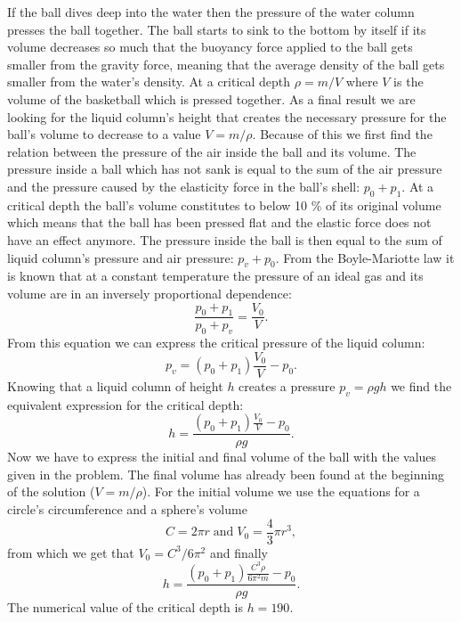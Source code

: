 \documentclass[11pt]{article}
\begin{document}
\solueng
If the ball dives deep into the water then the pressure of the water column presses the ball together. The ball starts to sink to the bottom by itself if its volume decreases so much that the buoyancy force applied to the ball gets smaller from the gravity force, meaning that the average density of the ball gets smaller from the water’s density. At a critical depth $\rho=m/V$ where $V$ is the volume of the basketball which is pressed together. As a final result we are looking for the liquid column’s height that creates the necessary pressure for the ball’s volume to decrease to a value $V=m/\rho$. Because of this we first find the relation between the pressure of the air inside the ball and its volume. The pressure inside a ball which has not sank is equal to the sum of the air pressure and the pressure caused by the elasticity force in the ball’s shell: $p_0+p_1$. At a critical depth the ball’s volume constitutes to below 10 \% of its original volume which means that the ball has been pressed flat and the elastic force does not have an effect anymore. The pressure inside the ball is then equal to the sum of liquid column’s pressure and air pressure: $p_v+p_0$. From the Boyle-Mariotte law it is known that at a constant temperature the pressure of an ideal gas and its volume are in an inversely proportional dependence:
\[
\frac{p_0+p_1}{p_0+p_v}=\frac{V_0}{V}.
\]
From this equation we can express the critical pressure of the liquid column:
\[
p_v = (p_0+p_1) \frac{V_0}{V} - p_0.
\] 
Knowing that a liquid column of height $h$ creates a pressure $p_v=\rho g h$ we find the equivalent expression for the critical depth:
\[
h = \frac{(p_0+p_1) \frac{V_0}{V} - p_0}{\rho g}.
\] 
Now we have to express the initial and final volume of the ball with the values given in the problem. The final volume has already been found at the beginning of the solution ($V=m/\rho$). For the initial volume we use the equations for a circle’s circumference and a sphere’s volume
\[
C = 2\pi r \; \text{and} \; V_0 = \frac{4}{3}\pi r^3,
\] 
from which we get that $V_0=C^3/6\pi^2$ and finally
\[
h = \frac{(p_0+p_1) \frac{C^3 \rho}{6\pi^2 m} - p_0}{\rho g}.
\] 
The numerical value of the critical depth is $h=190$.
\probend
\bigskip

\end{document}
